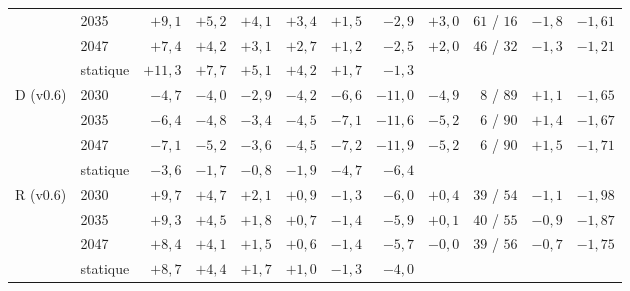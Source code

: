 \begin{longtable}{llrrrrrrrrrr}
 & 2035 & $+9{,}1$ & $+5{,}2$ & $+4{,}1$ & $+3{,}4$ & $+1{,}5$ & $-2{,}9$ & $+3{,}0$ & $61$ / $16$ & $-1{,}8$ & $-1{,}61$\\
 & 2047 & $+7{,}4$ & $+4{,}2$ & $+3{,}1$ & $+2{,}7$ & $+1{,}2$ & $-2{,}5$ & $+2{,}0$ & $46$ / $32$ & $-1{,}3$ & $-1{,}21$\\
 & statique & $+11{,}3$ & $+7{,}7$ & $+5{,}1$ & $+4{,}2$ & $+1{,}7$ & $-1{,}3$ & & & & \\
\addlinespace
D (v0.6) & 2030 & $-4{,}7$ & $-4{,}0$ & $-2{,}9$ & $-4{,}2$ & $-6{,}6$ & $-11{,}0$ & $-4{,}9$ & $8$ / $89$ & $+1{,}1$ & $-1{,}65$\\
 & 2035 & $-6{,}4$ & $-4{,}8$ & $-3{,}4$ & $-4{,}5$ & $-7{,}1$ & $-11{,}6$ & $-5{,}2$ & $6$ / $90$ & $+1{,}4$ & $-1{,}67$\\
 & 2047 & $-7{,}1$ & $-5{,}2$ & $-3{,}6$ & $-4{,}5$ & $-7{,}2$ & $-11{,}9$ & $-5{,}2$ & $6$ / $90$ & $+1{,}5$ & $-1{,}71$\\
 & statique & $-3{,}6$ & $-1{,}7$ & $-0{,}8$ & $-1{,}9$ & $-4{,}7$ & $-6{,}4$ & & & & \\
\addlinespace
R (v0.6) & 2030 & $+9{,}7$ & $+4{,}7$ & $+2{,}1$ & $+0{,}9$ & $-1{,}3$ & $-6{,}0$ & $+0{,}4$ & $39$ / $54$ & $-1{,}1$ & $-1{,}98$\\
 & 2035 & $+9{,}3$ & $+4{,}5$ & $+1{,}8$ & $+0{,}7$ & $-1{,}4$ & $-5{,}9$ & $+0{,}1$ & $40$ / $55$ & $-0{,}9$ & $-1{,}87$\\
 & 2047 & $+8{,}4$ & $+4{,}1$ & $+1{,}5$ & $+0{,}6$ & $-1{,}4$ & $-5{,}7$ & $-0{,}0$ & $39$ / $56$ & $-0{,}7$ & $-1{,}75$\\
 & statique & $+8{,}7$ & $+4{,}4$ & $+1{,}7$ & $+1{,}0$ & $-1{,}3$ & $-4{,}0$ & & & & \\\bottomrule\end{longtable}